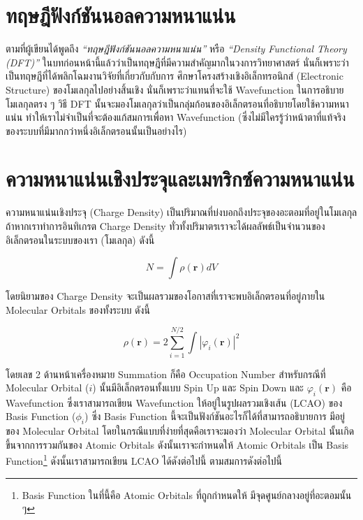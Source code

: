 \section{ทฤษฎีฟังก์ชันนอลความหนาแน่น}
\label{sec:dft}

ตามที่ผู้เขียนได้พูดถึง \textit{\enquote{ทฤษฎีฟังก์ชันนอลความหนาแน่น}} หรือ \textit{\enquote{Density Functional Theory 
(DFT)}} ในบทก่อนหน้านี้แล้วว่าเป็นทฤษฎีที่มีความสำคัญมากในวงการวิทยาศาสตร์ นั่นก็เพราะว่าเป็นทฤษฎีที่ได้พลิกโฉมงานวิจัยที่เกี่ยวกับกับการ%
ศึกษาโครงสร้างเชิงอิเล็กทรอนิกส์ (Electronic Structure) ของโมเลกุลไปอย่างสิ้นเชิง นั่นก็เพราะว่าแทนที่จะใช้ Wavefunction ในการอธิบาย%
โมเลกุลตรง ๆ วิธี DFT นั้นจะมองโมเลกุลว่าเป็นกลุ่มก้อนของอิเล็กตรอนที่อธิบายโดยใช้ความหนาแน่น ทำให้เราไม่จำเป็นที่จะต้องแก้สมการเพื่อหา 
Wavefunction (ซึ่งไม่มีใครรู้ว่าหน้าตาที่แท้จริงของระบบที่มีมากกว่าหนึ่งอิเล็กตรอนนั้นเป็นอย่างไร)

\section{ความหนาแน่นเชิงประจุและเมทริกซ์ความหนาแน่น}
\label{sec:charge_den}

ความหนาแน่นเชิงประจุ (Charge Density) เป็นปริมาณที่บ่งบอกถึงประจุของอะตอมที่อยู่ในโมเลกุล ถ้าหากเราทำการอินทิเกรต Charge Density 
ทั่วทั้งปริมาตรเราจะได้ผลลัพธ์เป็นจำนวนของอิเล็กตรอนในระบบของเรา (โมเลกุล) ดังนี้\autocite{szabo1996}

\begin{equation}
    N = \int \rho (\mathbf{r}) dV
\end{equation}

โดยนิยามของ Charge Density จะเป็นผลรวมของโอกาสที่เราจะพบอิเล็กตรอนที่อยู่ภายใน Molecular Orbitals ของทั้งระบบ ดังนี้

\begin{equation}\label{eq:charge_density}
    \rho (\mathbf{r}) = 2 \sum^{N/2}_{i=1} \int |\varphi_{i}(\mathbf{r})|^{2}
\end{equation}

\noindent โดยเลข 2 ด้านหน้าเครื่องหมาย Summation ก็คือ Occupation Number สำหรับกรณีที่ Molecular Orbital ($i$) 
นั้นมีอิเล็กตรอนทั้งแบบ Spin Up และ Spin Down และ $\varphi_{i}(\mathbf{r})$ คือ Wavefunction ซึ่งเราสามารถเขียน Wavefunction 
ให้อยู่ในรูปผลรวมเชิงเส้น (LCAO) ของ Basis Function ($\phi_{i}$) ซึ่ง Basis Function นี้จะเป็นฟังก์ชันอะไรก็ได้ที่สามารถอธิบายการ%
มีอยู่ของ Molecular Orbital โดยในกรณีแบบที่ง่ายที่สุดคือเราจะมองว่า Molecular Orbital นั้นเกิดขึ้นจากการรวมกันของ Atomic Orbitals 
ดังนั้นเราจะกำหนดให้ Atomic Orbitals เป็น Basis Function\footnote{Basis Function ในที่นี้คือ Atomic Orbitals ที่ถูกกำหนดให้%
มีจุดศูนย์กลางอยู่ที่อะตอมนั้น ๆ} ดังนั้นเราสามารถเขียน LCAO ได้ดังต่อไปนี้ 
ตามสมการดังต่อไปนี้

